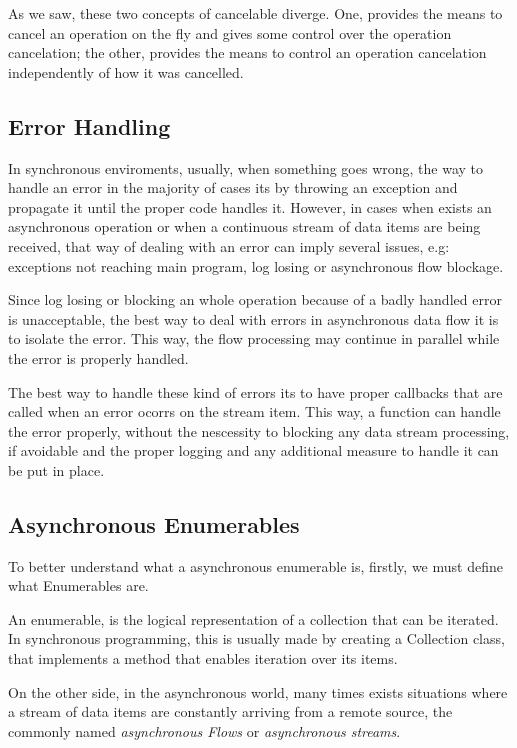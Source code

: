 	As we saw, these two concepts of cancelable diverge. One, provides the means to cancel an operation on the fly and gives some control over the operation cancelation; the other, provides the means to control an operation cancelation independently of how it was cancelled.
	
	\clearpage
	\subsection{Error Handling}  
	In synchronous enviroments, usually, when something goes wrong, the way to handle an error in the majority of cases its by throwing an exception and propagate it until the proper code handles it. 
	However, in cases when exists an asynchronous operation or when a continuous stream of data items are being received, that way of dealing with an error can imply several issues, e.g: exceptions not reaching main program, log losing or asynchronous flow blockage. 
	
	Since log losing or blocking an whole operation because of a badly handled error is unacceptable, the best way to deal with errors in asynchronous data flow it is to isolate the error. This way, the flow processing may continue in parallel while the error is properly handled.
	
	The best way to handle these kind of errors its to have proper callbacks that are called when an error ocorrs on the stream item. This way, a function can handle the error properly, without the nescessity to blocking any data stream processing, if avoidable and the proper logging and any additional measure to handle it can be put in place.
	\clearpage
	

	\subsection{Asynchronous Enumerables}
	\label{sec:aenums}
	To better understand what a asynchronous enumerable is, firstly, we must define what Enumerables are. 
	
	An enumerable, is the logical representation of a collection that can be iterated. 
	In synchronous programming, this is usually made by creating a Collection class, that implements a method that enables iteration over its items.
	
	On the other side, in the asynchronous world, many times exists situations where a stream of data items are constantly arriving from a remote source, the commonly named \textit{asynchronous Flows} or \textit{asynchronous streams}. 
	
